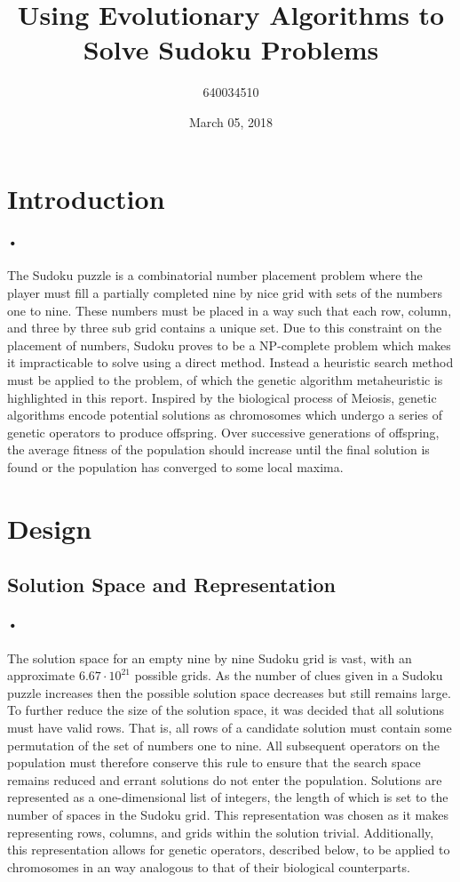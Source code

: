 \documentclass[10pt]{article}
\begin{document}
\title{%
	Using Evolutionary Algorithms to Solve Sudoku Problems
	}
\author{640034510}
\date{March 05, 2018}
\maketitle

\section{Introduction}
\paragraph{•}
The Sudoku puzzle is a combinatorial number placement problem where the player must fill a partially completed nine by nice grid with sets of the numbers one to nine. These numbers must be placed in a way such that each row, column, and three by three sub grid contains a unique set. Due to this constraint on the placement of numbers, Sudoku proves to be a NP-complete problem which makes it impracticable to solve using a direct method. Instead a heuristic search method must be applied to the problem, of which the genetic algorithm metaheuristic is highlighted in this report. Inspired by the biological process of Meiosis, genetic algorithms encode potential solutions as chromosomes which undergo a series of genetic operators to produce offspring. Over successive generations of offspring, the average fitness of the population should increase until the final solution is found or the population has converged to some local maxima.
\section{Design}
\subsection{Solution Space and Representation}
\paragraph{•}
The solution space for an empty nine by nine Sudoku grid is vast, with an approximate $6.67\cdot10^{21}$ possible grids. As the number of clues given in a Sudoku puzzle increases then the possible solution space decreases but still remains large. To further reduce the size of the solution space, it was decided that all solutions must have valid rows. That is, all rows of a candidate solution must contain some permutation of the set of numbers one to nine. All subsequent operators on the population must therefore conserve this rule to ensure that the search space remains reduced and errant solutions do not enter the population. Solutions are represented as a one-dimensional list of integers, the length of which is set to the number of spaces in the Sudoku grid. This representation was chosen as it makes representing rows, columns, and grids within the solution trivial. Additionally, this representation allows for genetic operators, described below, to be applied to chromosomes in an way analogous to that of their biological counterparts.
\end{document}
